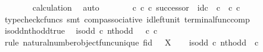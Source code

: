 \begin{isabellebody}
\ \ \ \ \ \ \isamarkupfalse%
\ calculation\ \isamarkupfalse%
\ auto\isanewline
\ \ \isamarkupfalse%
\isanewline
\isanewline
\ \ \isamarkupfalse%
\ {\isachardoublequoteopen}{\isacharparenleft}{\kern0pt}{\isasymt}\ {\isasymcirc}\isactrlsub c\ {\isasymbeta}\isactrlbsub {\isasymnat}\isactrlsub c\isactrlesub {\isacharparenright}{\kern0pt}\ {\isasymcirc}\isactrlsub c\ successor\ {\isacharequal}{\kern0pt}\ id\isactrlsub c\ {\isasymOmega}\ {\isasymcirc}\isactrlsub c\ {\isasymt}\ {\isasymcirc}\isactrlsub c\ {\isasymbeta}\isactrlbsub {\isasymnat}\isactrlsub c\isactrlesub {\isachardoublequoteclose}\isanewline
\ \ \ \ \isamarkupfalse%
\ {\isacharparenleft}{\kern0pt}typecheck{\isacharunderscore}{\kern0pt}cfuncs{\isacharcomma}{\kern0pt}\ smt\ comp{\isacharunderscore}{\kern0pt}associative{}\ id{\isacharunderscore}{\kern0pt}left{\isacharunderscore}{\kern0pt}unit{}\ terminal{\isacharunderscore}{\kern0pt}func{\isacharunderscore}{\kern0pt}comp{\isacharparenright}{\kern0pt}\isanewline
{}\isamarkupfalse%
%
\endisatagproof
{\isafoldproof}%
%
\isadelimproof
\isanewline
%
\endisadelimproof
\isanewline
{}\isamarkupfalse%
\ is{\isacharunderscore}{\kern0pt}odd{\isacharunderscore}{\kern0pt}nth{\isacharunderscore}{\kern0pt}odd{\isacharunderscore}{\kern0pt}true{\isacharcolon}{\kern0pt}\isanewline
\ \ {\isachardoublequoteopen}is{\isacharunderscore}{\kern0pt}odd\ {\isasymcirc}\isactrlsub c\ nth{\isacharunderscore}{\kern0pt}odd\ {\isacharequal}{\kern0pt}\ {\isasymt}\ {\isasymcirc}\isactrlsub c\ {\isasymbeta}\isactrlbsub {\isasymnat}\isactrlsub c\isactrlesub {\isachardoublequoteclose}\isanewline
%
\isadelimproof
%
\endisadelimproof
%
\isatagproof
{}\isamarkupfalse%
\ {\isacharparenleft}{\kern0pt}rule\ natural{\isacharunderscore}{\kern0pt}number{\isacharunderscore}{\kern0pt}object{\isacharunderscore}{\kern0pt}func{\isacharunderscore}{\kern0pt}unique{\isacharbrackleft}{\kern0pt}\ f{\isacharequal}{\kern0pt}{\isachardoublequoteopen}id\ {\isasymOmega}{\isachardoublequoteclose}{\isacharcomma}{\kern0pt}\ \ X{\isacharequal}{\kern0pt}{\isasymOmega}{\isacharbrackright}{\kern0pt}{\isacharparenright}{\kern0pt}\isanewline
\ \ \isamarkupfalse%
\ {\isachardoublequoteopen}is{\isacharunderscore}{\kern0pt}odd\ {\isasymcirc}\isactrlsub c\ nth{\isacharunderscore}{\kern0pt}odd\ {\isacharcolon}{\kern0pt}\ {\isasymnat}\isactrlsub c\ {\isasymrightarrow}\ {\isasymOmega}{\isachardoublequoteclose}\isanewline
\ \ \ \ \isamarkupfalse%

\end{isabellebody}
